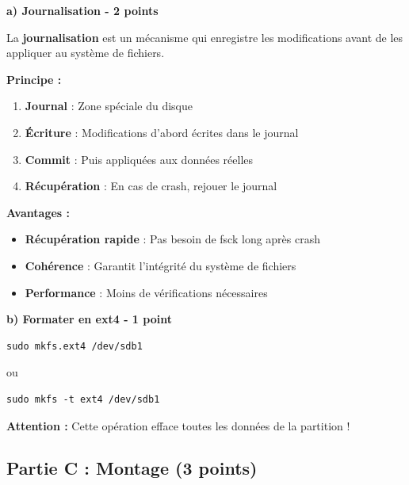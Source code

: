 \documentclass[12pt,a4paper]{article}
\begin{document}
\begin{answerbox}
\textbf{a) Journalisation - 2 points}

La \textbf{journalisation} est un mécanisme qui enregistre les modifications avant de les appliquer au système de fichiers.

\textbf{Principe :}
\begin{enumerate}
    \item \textbf{Journal} : Zone spéciale du disque
    \item \textbf{Écriture} : Modifications d'abord écrites dans le journal
    \item \textbf{Commit} : Puis appliquées aux données réelles
    \item \textbf{Récupération} : En cas de crash, rejouer le journal
\end{enumerate}

\textbf{Avantages :}
\begin{itemize}
    \item \textbf{Récupération rapide} : Pas besoin de fsck long après crash
    \item \textbf{Cohérence} : Garantit l'intégrité du système de fichiers
    \item \textbf{Performance} : Moins de vérifications nécessaires
\end{itemize}

\textbf{b) Formater en ext4 - 1 point}

\begin{lstlisting}
sudo mkfs.ext4 /dev/sdb1
\end{lstlisting}

ou

\begin{lstlisting}
sudo mkfs -t ext4 /dev/sdb1
\end{lstlisting}

\textbf{Attention :} Cette opération efface toutes les données de la partition !
\end{answerbox}

\subsection*{Partie C : Montage (3 points)}
\end{document}
